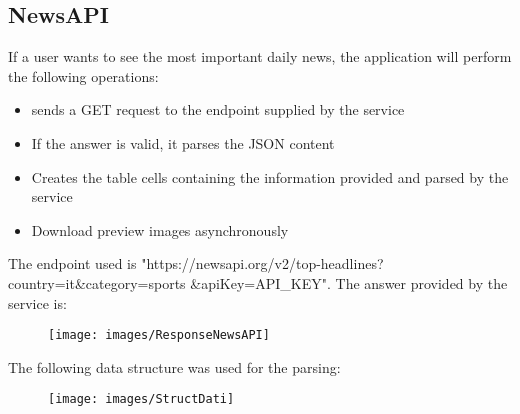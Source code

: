 \documentclass[numbers=noenddot, 12pt, a4paper, oneside]{scrbook}
\begin{document}
\subsection*{NewsAPI}
If a user wants to see the most important daily news, the application will perform the following operations:
\begin{itemize}
	\item sends a GET request to the endpoint supplied by the service
	\item If the answer is valid, it parses the JSON content
	\item Creates the table cells containing the information provided and parsed by the service 
	\item Download preview images asynchronously
\end{itemize}
The endpoint used is "https://newsapi.org/v2/top-headlines?country=it\&category=sports \&apiKey=API\_KEY". The answer provided by the service is:
\begin{figure}[H]
	\centering
	\texttt{[image: images/ResponseNewsAPI]}
\end{figure}
The following data structure was used for the parsing:
\begin{figure}[H]
	\centering
	\texttt{[image: images/StructDati]}
\end{figure}
\end{document}
